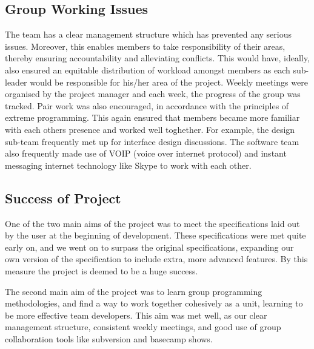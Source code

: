 \subsection{Group Working Issues}

The team has a clear management structure which has prevented any serious issues. Moreover, this enables members to take responsibility of their areas, thereby ensuring accountability and alleviating conflicts. This would have, ideally, also ensured an equitable distribution of workload amongst members as each sub-leader would be responsible for his/her area of the project.
Weekly meetings were organised by the project manager and each week, the progress of the group was tracked. Pair work was also encouraged, in accordance with the principles of extreme programming. This again ensured that members became more familiar with each others presence and worked well toghether. For example, the design sub-team frequently met up for interface design discussions. The software team also frequently made use of VOIP (voice over internet protocol) and instant messaging internet technology like Skype to work with each other.

\subsection{Success of Project}

One of the two main aims of the project was to meet the specifications laid out by the user at the beginning of development. These specifications were met quite early on, and we went on to surpass the original specifications, expanding our own version of the specification to include extra, more advanced features. By this measure the project is deemed to be a huge success.

The second main aim of the project was to learn group programming methodologies, and find a way to work together cohesively as a unit, learning to be more effective team developers. This aim was met well, as our clear management structure, consistent weekly meetings, and good use of group collaboration tools like subversion and basecamp shows.
